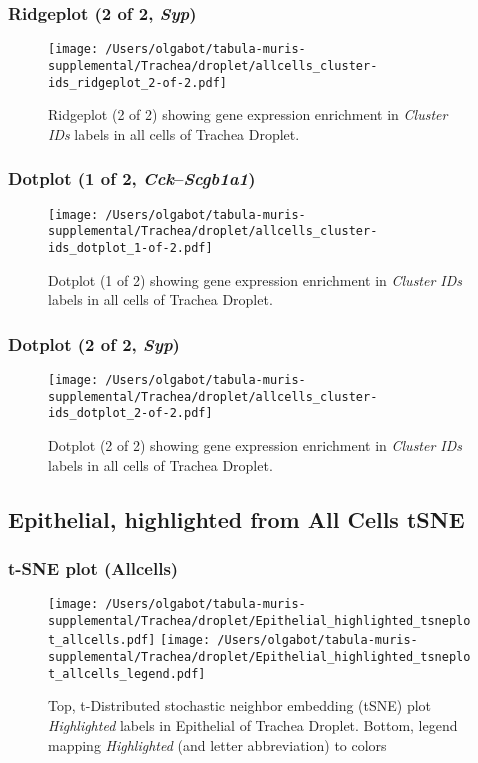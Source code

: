 \clearpage

\subsubsection{Ridgeplot (2 of 2, \emph{Syp})}
\begin{figure}[h]
\centering
\texttt{[image: /Users/olgabot/tabula-muris-supplemental/Trachea/droplet/allcells\_cluster-ids\_ridgeplot\_2-of-2.pdf]}

\caption{ Ridgeplot (2 of 2)  showing gene expression enrichment in \emph{Cluster IDs} labels in all cells of Trachea Droplet. }
\end{figure}


\clearpage

\subsubsection{Dotplot (1 of 2, \emph{Cck}--\emph{Scgb1a1})}
\begin{figure}[h]
\centering
\texttt{[image: /Users/olgabot/tabula-muris-supplemental/Trachea/droplet/allcells\_cluster-ids\_dotplot\_1-of-2.pdf]}

\caption{ Dotplot (1 of 2)  showing gene expression enrichment in \emph{Cluster IDs} labels in all cells of Trachea Droplet. }
\end{figure}


\clearpage

\subsubsection{Dotplot (2 of 2, \emph{Syp})}
\begin{figure}[h]
\centering
\texttt{[image: /Users/olgabot/tabula-muris-supplemental/Trachea/droplet/allcells\_cluster-ids\_dotplot\_2-of-2.pdf]}

\caption{ Dotplot (2 of 2)  showing gene expression enrichment in \emph{Cluster IDs} labels in all cells of Trachea Droplet. }
\end{figure}


\clearpage
\subsection{Epithelial, highlighted from All Cells tSNE}
\subsubsection{t-SNE plot (Allcells)}
\begin{figure}[h]
\centering
\texttt{[image: /Users/olgabot/tabula-muris-supplemental/Trachea/droplet/Epithelial\_highlighted\_tsneplot\_allcells.pdf]}
\texttt{[image: /Users/olgabot/tabula-muris-supplemental/Trachea/droplet/Epithelial\_highlighted\_tsneplot\_allcells\_legend.pdf]}
\caption{Top, t-Distributed stochastic neighbor embedding (tSNE) plot  \emph{Highlighted} labels in Epithelial of Trachea Droplet. Bottom, legend mapping \emph{Highlighted} (and letter abbreviation) to colors}
\end{figure}


